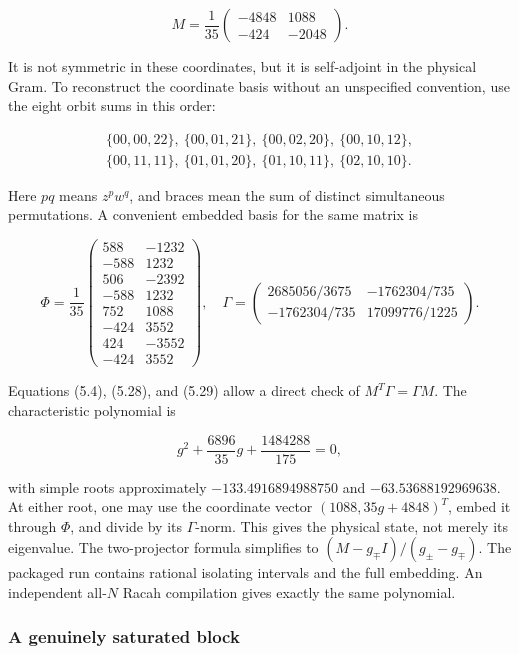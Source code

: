 \documentclass[a4paper,11pt]{article}
\numberwithin{equation}{section}
\begin{document}
\[
M=\frac1{35}\begin{pmatrix}-4848&1088\\-424&-2048\end{pmatrix}.
\tag{5.28}
\]

It is not symmetric in these coordinates, but it is self-adjoint in the physical Gram. To reconstruct the coordinate basis without an unspecified convention, use the eight orbit sums in this order:

\[
\begin{gathered}
\{00,00,22\},\ \{00,01,21\},\ \{00,02,20\},\ \{00,10,12\},\\
\{00,11,11\},\ \{01,01,20\},\ \{01,10,11\},\ \{02,10,10\}.
\end{gathered}
\]

Here \(pq\) means \(z^pw^q\), and braces mean the sum of distinct simultaneous permutations. A convenient embedded basis for the same matrix is

\[
\Phi=\frac1{35}
\begin{pmatrix}
588&-1232\\-588&1232\\506&-2392\\-588&1232\\
752&1088\\-424&3552\\424&-3552\\-424&3552
\end{pmatrix},
\quad
\Gamma=\begin{pmatrix}
2685056/3675&-1762304/735\\
-1762304/735&17099776/1225
\end{pmatrix}.
\tag{5.29}
\]

Equations (5.4), (5.28), and (5.29) allow a direct check of \(M^T\Gamma=\Gamma M\). The characteristic polynomial is

\[
g^2+\frac{6896}{35}g+\frac{1484288}{175}=0,
\tag{5.30}
\]

with simple roots approximately \(-133.4916894988750\) and \(-63.53688192969638\). At either root, one may use the coordinate vector \((1088,35g+4848)^T\), embed it through \(\Phi\), and divide by its \(\Gamma\)-norm. This gives the physical state, not merely its eigenvalue. The two-projector formula simplifies to \((M-g_{\mp}I)/(g_{\pm}-g_{\mp})\). The packaged run contains rational isolating intervals and the full embedding. An independent all-\(N\) Racah compilation gives exactly the same polynomial.

\hypertarget{a-genuinely-saturated-block}{%
\subsubsection{A genuinely saturated block}\label{a-genuinely-saturated-block}}
\end{document}
